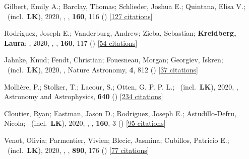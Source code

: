\item[{\color{numcolor}\scriptsize39}] Gilbert, Emily A.; Barclay, Thomas; Schlieder, Joshua E.; Quintana, Elisa V.; \etal\ (incl.\ \textbf{LK}), 2020, , \aj, \textbf{160}, 116 () [\href{https://ui.adsabs.harvard.edu/abs/2020AJ....160..116G}{127 citations}]

\item[{\color{numcolor}\scriptsize38}] Rodriguez, Joseph E.; Vanderburg, Andrew; Zieba, Sebastian; \textbf{Kreidberg, Laura}; \etal, 2020, , \aj, \textbf{160}, 117 () [\href{https://ui.adsabs.harvard.edu/abs/2020AJ....160..117R}{54 citations}]

\item[{\color{numcolor}\scriptsize37}] Jahnke, Knud; Fendt, Christian; Fouesneau, Morgan; Georgiev, Iskren; \etal\ (incl.\ \textbf{LK}), 2020, , Nature Astronomy, \textbf{4}, 812 () [\href{https://ui.adsabs.harvard.edu/abs/2020NatAs...4..812J}{37 citations}]

\item[{\color{numcolor}\scriptsize36}] Molli{\`e}re, P.; Stolker, T.; Lacour, S.; Otten, G. P. P. L.; \etal\ (incl.\ \textbf{LK}), 2020, , Astronomy and Astrophysics, \textbf{640} () [\href{https://ui.adsabs.harvard.edu/abs/2020A&A...640A.131M}{234 citations}]

\item[{\color{numcolor}\scriptsize35}] Cloutier, Ryan; Eastman, Jason D.; Rodriguez, Joseph E.; Astudillo-Defru, Nicola; \etal\ (incl.\ \textbf{LK}), 2020, , \aj, \textbf{160}, 3 () [\href{https://ui.adsabs.harvard.edu/abs/2020AJ....160....3C}{95 citations}]

\item[{\color{numcolor}\scriptsize34}] Venot, Olivia; Parmentier, Vivien; Blecic, Jasmina; Cubillos, Patricio E.; \etal\ (incl.\ \textbf{LK}), 2020, , \apj, \textbf{890}, 176 () [\href{https://ui.adsabs.harvard.edu/abs/2020ApJ...890..176V}{77 citations}]

